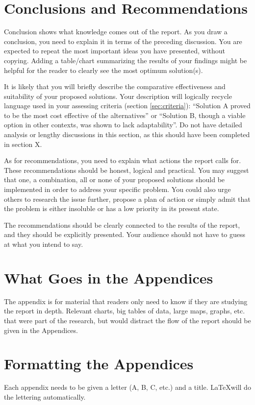 \documentclass[peerreview]{IEEEtran}
\begin{document}

\section{Conclusions and Recommendations}
Conclusion shows what knowledge comes out of the report. As you draw a conclusion, you need to explain it in terms of the preceding discussion. You are expected to repeat the most important ideas you have presented, without copying. Adding a table/chart summarizing the results of your findings might be helpful for the reader to clearly see the most optimum solution(s). 

It is likely that you will briefly describe the comparative effectiveness and suitability of your proposed solutions. Your description will logically recycle language used in your assessing criteria (section \ref{sec:criteria}): ``Solution A proved to be the most cost effective of the alternatives'' or ``Solution B, though a viable option in other contexts, was shown to lack adaptability''.  Do not have detailed analysis or lengthy discussions in this section, as this should have been completed in section X. 
 
As for recommendations, you need to explain what actions the report calls for. These recommendations should be honest, logical and practical. You may suggest that one, a combination, all or none of your proposed solutions should be implemented in order to address your specific problem. You could also urge others to research the issue further, propose a plan of action or simply admit that the problem is either insoluble or has a low priority in its present state.   

The recommendations should be clearly connected to the results of the report, and they should be explicitly presented. Your audience should not have to guess at what you intend to say.  




\appendices
\section{What Goes in the Appendices} \label{App:WhatGoes}
The appendix is for material that readers only need to know if they are studying the report in depth. Relevant charts, big tables of data, large maps, graphs, etc. that were part of the research, but would distract the flow of the report should be given in the Appendices. 
\section{Formatting the Appendices} \label{App:Formatting}
Each appendix needs to be given a letter (A, B, C, etc.) and a title. \LaTeX will do the lettering automatically.


\printbibliography
\end{document}
